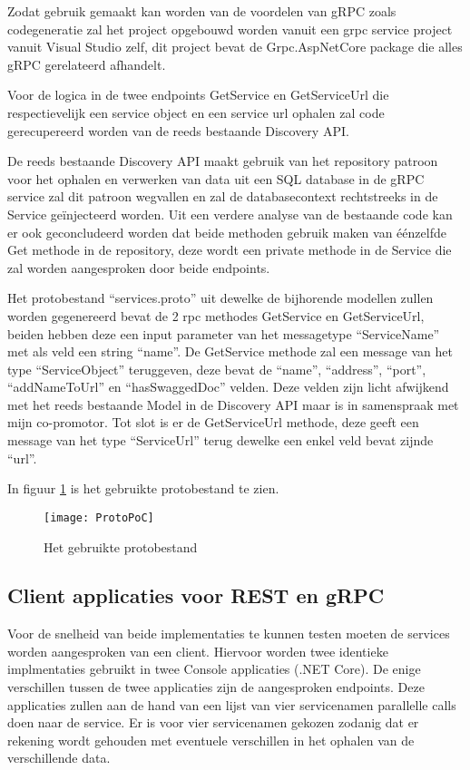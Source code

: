 Zodat gebruik gemaakt kan worden van de voordelen van gRPC zoals codegeneratie zal het project opgebouwd worden vanuit een grpc service project vanuit Visual Studio zelf, dit project bevat de Grpc.AspNetCore package die alles gRPC gerelateerd afhandelt.

Voor de logica in de twee endpoints GetService en GetServiceUrl die respectievelijk een service object en een service url ophalen zal code gerecupereerd worden van de reeds bestaande Discovery API.

De reeds bestaande Discovery API maakt gebruik van het repository patroon voor het ophalen en verwerken van data uit een SQL database in de gRPC service zal dit patroon wegvallen en zal de databasecontext rechtstreeks in de Service geïnjecteerd worden. Uit een verdere analyse van de bestaande code kan er ook geconcludeerd worden dat beide methoden gebruik maken van éénzelfde Get methode in de repository, deze wordt een private methode in de Service die zal worden aangesproken door beide endpoints.

Het protobestand “services.proto” uit dewelke de bijhorende modellen zullen worden gegenereerd bevat de 2 rpc methodes GetService en GetServiceUrl, beiden hebben deze een input parameter van het messagetype “ServiceName” met als veld een string “name”.
De GetService methode zal een message van het type “ServiceObject” teruggeven, deze bevat de “name”, “address”, “port”, “addNameToUrl” en “hasSwaggedDoc” velden. Deze velden zijn licht afwijkend met het reeds bestaande Model in de Discovery API maar is in samenspraak met mijn co-promotor.
Tot slot is er de GetServiceUrl methode, deze geeft een message van het type “ServiceUrl” terug dewelke een enkel veld bevat zijnde “url”.

In figuur \ref{fig:ProtoPoC} is het gebruikte protobestand te zien.

\begin{figure}[H]
    \centering
    \texttt{[image: ProtoPoC]}
    \caption[Proof-Of-Concept protobestand]{Het gebruikte protobestand}
    \label{fig:ProtoPoC}
\end{figure}

\subsection{Client applicaties voor REST en gRPC}
\label{subsec:Client applicaties voor REST en gRPC}

Voor de snelheid van beide implementaties te kunnen testen moeten de services worden aangesproken van een client. Hiervoor worden twee identieke implmentaties gebruikt in twee Console applicaties (.NET Core). De enige verschillen tussen de twee applicaties zijn de aangesproken endpoints. Deze applicaties zullen aan de hand van een lijst van vier servicenamen parallelle calls doen naar de service. Er is voor vier servicenamen gekozen zodanig dat er rekening wordt gehouden met eventuele verschillen in het ophalen van de verschillende data.

